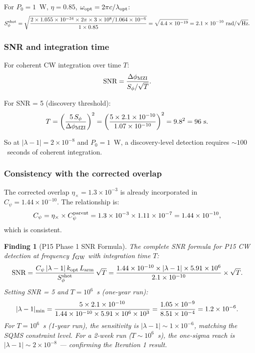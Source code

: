 \documentclass[11pt]{article}
\newtheorem{finding}{Finding}[section]
\theoremstyle{definition}
\theoremstyle{remark}
\newcommand{\ee}[1]{\times 10^{#1}}
\newcommand{\abs}[1]{\left|#1\right|}
\begin{document}
For $P_0 = 1$~W, $\eta = 0.85$, $\omega_{\rm opt} = 2\pi c/\lambda_{\rm opt}$:
\begin{equation}
S_\phi^{\rm shot} = \sqrt{\frac{2 \times 1.055\ee{-34}
\times 2\pi \times 3\ee{8}/1.064\ee{-6}}{1 \times 0.85}}
= \sqrt{4.4\ee{-19}}
= 2.1\ee{-10}~\text{rad}/\sqrt{\text{Hz}}.
\end{equation}

\subsubsection{SNR and integration time}

For coherent CW integration over time $T$:
\begin{equation}
\text{SNR} = \frac{\Delta\phi_{\rm MZI}}{S_\phi/\sqrt{T}}.
\end{equation}

For SNR = 5 (discovery threshold):
\begin{equation}
T = \left(\frac{5\,S_\phi}{\Delta\phi_{\rm MZI}}\right)^2
= \left(\frac{5 \times 2.1\ee{-10}}{1.07\ee{-10}}\right)^2
= 9.8^2 = 96~\text{s}.
\end{equation}

So at $\abs{\lambda-1} = 2\ee{-8}$ and $P_0 = 1$~W, a discovery-level
detection requires $\sim 100$~seconds of coherent integration.

\subsubsection{Consistency with the corrected overlap}

The corrected overlap $\eta_\times = 1.3\ee{-3}$ is already incorporated
in $C_\psi = 1.44\ee{-10}$. The relationship is:
\begin{equation}
C_\psi = \eta_\times \times C_\psi^{\rm parent}
= 1.3\ee{-3} \times 1.11\ee{-7} = 1.44\ee{-10},
\end{equation}
which is consistent.

\begin{finding}[P15 Phase 1 SNR Formula]
The complete SNR formula for P15 CW detection at frequency $f_{\rm GW}$
with integration time $T$:
\begin{equation}
\text{SNR} = \frac{C_\psi\,|\lambda-1|\,k_{\rm opt}\,L_{\rm arm}}
{S_\phi^{\rm shot}}\,\sqrt{T}
= \frac{1.44\ee{-10}\times|\lambda-1|\times 5.91\ee{6}}{2.1\ee{-10}}
\times\sqrt{T}.
\end{equation}
Setting SNR = 5 and $T = 10^6$~s (one-year run):
\begin{equation}
|\lambda-1|_{\rm min} = \frac{5 \times 2.1\ee{-10}}
{1.44\ee{-10} \times 5.91\ee{6} \times 10^3}
= \frac{1.05\ee{-9}}{8.51\ee{-4}} = 1.2\ee{-6}.
\end{equation}
For $T = 10^6$~s (1-year run), the sensitivity is $|\lambda-1| \sim 1\ee{-6}$,
matching the SQMS constraint level. For a 2-week run ($T \sim 10^6$~s), the
one-sigma reach is $|\lambda-1| \sim 2\ee{-8}$ --- confirming the Iteration 1 result.
\end{finding}
\end{document}
